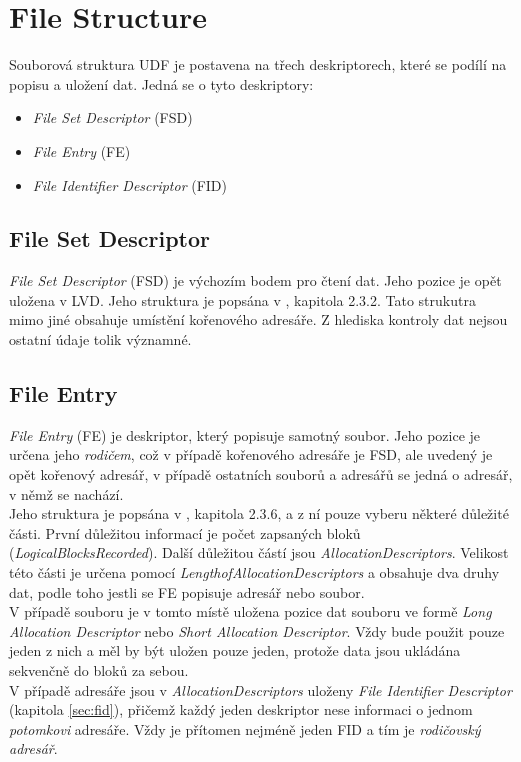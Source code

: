 \section{File Structure}
\label{sec:fsd}
Souborová struktura UDF je postavena na třech deskriptorech, které se podílí na popisu a uložení dat. Jedná se o tyto deskriptory:
\begin{itemize}
    \item \textit{File Set Descriptor} (FSD)
    \item \textit{File Entry} (FE)
    \item \textit{File Identifier Descriptor} (FID)
\end{itemize}

\subsection{File Set Descriptor}
\label{sec:fsd}
\textit{File Set Descriptor} (FSD) je výchozím bodem pro čtení dat. Jeho pozice je opět uložena v LVD. Jeho struktura je popsána v \cite{osta-udf-0201}, kapitola 2.3.2. Tato strukutra mimo jiné obsahuje umístění kořenového adresáře. Z hlediska kontroly dat nejsou ostatní údaje tolik významné.

\subsection{File Entry}
\label{sec:fe}
\textit{File Entry} (FE) je deskriptor, který popisuje samotný soubor. Jeho pozice je určena jeho \textit{rodičem}, což v případě kořenového adresáře je FSD, ale uvedený je opět kořenový adresář, v případě ostatních souborů a adresářů se jedná o adresář, v němž se nachází.\\
Jeho struktura je popsána v \cite{osta-udf-0201}, kapitola 2.3.6, a z ní pouze vyberu některé důležité části. První důležitou informací je počet zapsaných bloků (\textit{LogicalBlocksRecorded}). Další důležitou částí jsou \textit{AllocationDescriptors}. Velikost této části je určena pomocí \textit{LengthofAllocationDescriptors} a obsahuje dva druhy dat, podle toho jestli se FE popisuje adresář nebo soubor.\\
V případě souboru je v tomto místě uložena pozice dat souboru ve formě \textit{Long Allocation Descriptor} nebo \textit{Short Allocation Descriptor}. Vždy bude použit pouze jeden z nich a měl by být uložen pouze jeden, protože data jsou ukládána sekvenčně do bloků za sebou.\\
V případě adresáře jsou v \textit{AllocationDescriptors} uloženy \textit{File Identifier Descriptor} (kapitola \ref{sec:fid}), přičemž každý jeden deskriptor nese informaci o jednom \textit{potomkovi} adresáře. Vždy je přítomen nejméně jeden FID a tím je \textit{rodičovský adresář}. 

